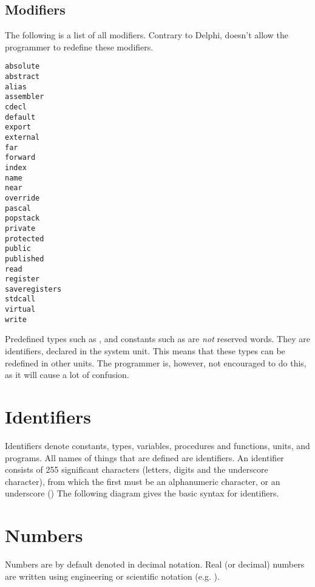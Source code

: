 \subsection{Modifiers}
The following is a list of all modifiers. Contrary to Delphi, \fpc doesn't
allow the programmer to redefine these modifiers.
\begin{multicols}{4}
\begin{verbatim}
absolute
abstract
alias
assembler
cdecl
default
export
external
far
forward
index
name
near
override
pascal
popstack
private
protected
public
published
read
register
saveregisters
stdcall
virtual
write
\end{verbatim}
\end{multicols}
\begin{remark}
Predefined types such as ,  and constants
such as  are {\em not} reserved words. They are
identifiers, declared in the system unit. This means that these types
can be redefined in other units. The programmer is, however, not
encouraged to do this, as it will cause a lot of confusion.
\end{remark}

\section{Identifiers}
Identifiers denote constants, types, variables, procedures and functions,
units, and programs. All names of things that are defined are identifiers.
An identifier consists of 255 significant characters (letters, digits and
the underscore character), from which the first must be an alphanumeric
character, or an underscore (\var{\_})
The following diagram gives the basic syntax for identifiers.


\section{Numbers}
Numbers are by default denoted in decimal notation.
Real (or decimal) numbers are written using engineering or scientific
notation (e.g. ).

